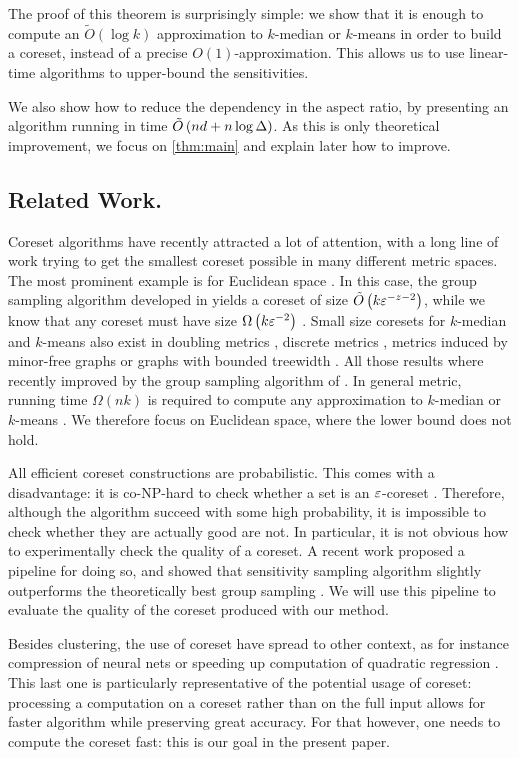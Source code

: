 The proof of this theorem is surprisingly simple: we show that it is enough to compute an $\tilde O(\log k)$ approximation to $k$-median or $k$-means in order to build a coreset, instead of a precise $O(1)$-approximation. This allows us to use linear-time algorithms to upper-bound the sensitivities.

We also show how to reduce the dependency in the aspect ratio, by presenting an algorithm running in time $\tilde O\left( nd + n \log \Delta\right)$. As this is only theoretical improvement, we focus on \cref{thm:main} and explain later how to improve.


\subsection{Related Work.}

Coreset algorithms have recently attracted a lot of attention, with a long line of work trying to get the smallest coreset possible in many different metric spaces. The most prominent example is for Euclidean space \cite{BadoiuHI02, HaM04, Chen09, HuangV20, stoc22}. 
In this case, the group sampling algorithm developed in \cite{stoc21, stoc22} yields a coreset of size $\tilde O\left( k \varepsilon^{-z-2}\right)$, while we know that any coreset must have size $\Omega \left( k\varepsilon^{-2}\right)$ \cite{stoc22}.
Small size coresets for $k$-median and $k$-means also exist in doubling metrics \cite{huang2018varepsilon}, discrete metrics \cite{FeldmanL11}, metrics induced by minor-free graphs \cite{BravermanJKW21} or graphs with bounded treewidth \cite{baker2020coresets}. 
All those results where recently improved by the group sampling algorithm of \cite{stoc21}. 
In general metric, running time $\Omega(nk)$ is required to compute any approximation to $k$-median or $k$-means \cite{mettu2004optimal}. 
We therefore focus on Euclidean space, where the lower bound does not hold.


All efficient coreset constructions are probabilistic. This comes with a disadvantage: it is co-NP-hard to check whether a set is an $\varepsilon$-coreset \cite{chrisESA}. Therefore, although the algorithm succeed with some high probability, it is impossible to check whether they are actually good are not. 
In particular, it is not obvious how to experimentally check the quality of a coreset.
A recent work proposed a pipeline for doing so, and showed that sensitivity sampling algorithm slightly outperforms the theoretically best group sampling \cite{chrisESA}. 
We will use this pipeline to evaluate the quality of the coreset produced with our method.

Besides clustering, the use of coreset have spread to other context, as for instance compression of neural nets \cite{BaykalLGFR19} or speeding up computation of quadratic regression \cite{MaaloufJF19}.
This last one is particularly representative of the potential usage of coreset: processing a computation on a coreset rather than on the full input allows for faster algorithm while preserving great accuracy.
For that however, one needs to compute the coreset fast: this is our goal in the present paper.